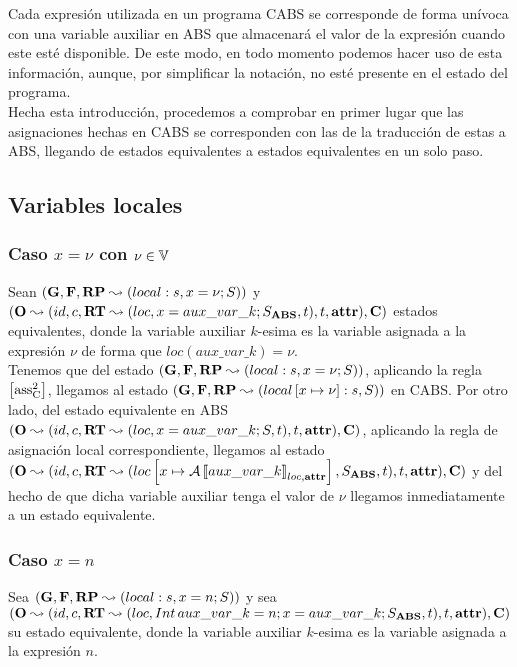 Cada expresión utilizada en un programa CABS se corresponde de forma unívoca con una variable auxiliar en ABS que almacenará el valor de la expresión cuando este esté disponible. De este modo, en todo momento podemos hacer uso de esta información, aunque, por simplificar la notación, no esté presente en el estado del programa.\\

Hecha esta introducción, procedemos a comprobar en primer lugar que las asignaciones hechas en CABS se corresponden con las de la traducción de estas a ABS, llegando de estados equivalentes a estados equivalentes en un solo paso.

\subsection{Variables locales}

\subsubsection{Caso $x = \nu$ con $\nu \in \mathbb{V}$}
Sean $(\mathbf{G}, \mathbf{F}, \textbf{RP} \leadsto (local:s,x = \nu\mbox{;\,}S))$ y $(\mathbf{O} \leadsto (id, c, \textbf{RT} \leadsto (loc, x = aux\_var\_k\mbox{;\,} S_{\textbf{ABS}}, t), t, \textbf{attr}), \mathbf{C})$ estados equivalentes, donde la variable auxiliar $k$-esima es la variable asignada a la expresión $\nu$ de forma que $loc(aux\_var\_k) = \nu$.\\

Tenemos que del estado $(\mathbf{G}, \mathbf{F}, \textbf{RP} \leadsto (local:s,x = \nu\mbox{;\,}S))$, aplicando la regla $\left[ \text{ass}_{\text{C}}^{2} \right]$, llegamos al estado $(\mathbf{G}, \mathbf{F}, \textbf{RP} \leadsto (local\left[ x\mapsto\nu \right]:s, S))$ en CABS. Por otro lado, del estado equivalente en ABS $(\mathbf{O} \leadsto (id, c, \textbf{RT} \leadsto (loc, x = aux\_var\_k\mbox{;\,} S, t), t, \textbf{attr}), \mathbf{C})$, aplicando la regla de asignación local correspondiente, llegamos al estado $(\mathbf{O} \leadsto (id, c, \textbf{RT} \leadsto (loc \left[ x\mapsto\mathcal{A} \left\llbracket aux\_var\_k \right\rrbracket_{loc, \textbf{attr}} \right], S_{\textbf{ABS}}, t), t, \textbf{attr}), \mathbf{C})$ y del hecho de que dicha variable auxiliar tenga el valor de $\nu$ llegamos inmediatamente a un estado equivalente.

\subsubsection{Caso $x = n$}
Sea $(\mathbf{G}, \mathbf{F}, \textbf{RP} \leadsto (local:s,x = n\mbox{;\,}S))$ y sea $(\mathbf{O} \leadsto (id, c, \textbf{RT} \leadsto (loc, Int\,aux\_var\_k = n\mbox{;\,} x = aux\_var\_k\mbox{;\,} S_{\textbf{ABS}}, t), t, \textbf{attr}), \mathbf{C})$ su estado equivalente, donde la variable auxiliar $k$-esima es la variable asignada a la expresión $n$.\\

